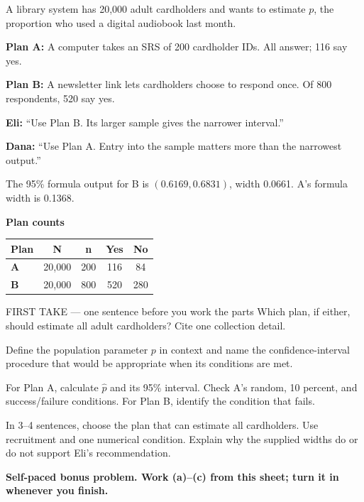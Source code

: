 \documentclass[14pt]{extarticle}
\begin{document}
\pagestyle{empty}


\noindent\begin{minipage}[t]{0.57\linewidth}
\vspace{0pt}
A library system has 20,000 adult cardholders and wants to estimate $p$, the proportion who used a digital audiobook last month.\par\smallskip \textbf{Plan A:} A computer takes an SRS of 200 cardholder IDs. All answer; 116 say yes.\par \textbf{Plan B:} A newsletter link lets cardholders choose to respond once. Of 800 respondents, 520 say yes.\par\smallskip \textbf{Eli:} ``Use Plan B. Its larger sample gives the narrower interval.''\par \textbf{Dana:} ``Use Plan A. Entry into the sample matters more than the narrowest output.''\par\smallskip The 95\% formula output for B is $(0.6169,0.6831)$, width 0.0661. A's formula width is 0.1368.\par
\end{minipage}\hfill
\begin{minipage}[t]{0.40\linewidth}
\vspace{0pt}
\begin{center}
\textbf{Plan counts}\par\smallskip
\begin{tabular}{|l|c|c|c|c|}
\hline
\textbf{Plan} & \textbf{N} & \textbf{n} & \textbf{Yes} & \textbf{No} \\ \hline
\textbf{A} & 20,000 & 200 & 116 & 84 \\ \hline
\textbf{B} & 20,000 & 800 & 520 & 280 \\ \hline
\end{tabular}
\end{center}
\end{minipage}

\begin{firsttakebox}{FIRST TAKE --- one sentence before you work the parts}
Which plan, if either, should estimate all adult cardholders? Cite one collection detail.
\end{firsttakebox}

\begin{description}[leftmargin=1.15in, labelwidth=1in, itemsep=2pt, topsep=2pt]
  \item[\dokbadge{1}~(a)] Define the population parameter $p$ in context and name the confidence-interval procedure that would be appropriate when its conditions are met.
  \item[\dokbadge{2}~(b)] For Plan A, calculate $\hat p$ and its 95\% interval. Check A's random, 10 percent, and success/failure conditions. For Plan B, identify the condition that fails.
  \item[\dokbadge{3}~(c)] In 3--4 sentences, choose the plan that can estimate all cardholders. Use recruitment and one numerical condition. Explain why the supplied widths do or do not support Eli's recommendation.
\end{description}

\vfill
\textbf{Self-paced bonus problem. Work (a)--(c) from this sheet; turn it in whenever you finish.}
\end{document}
